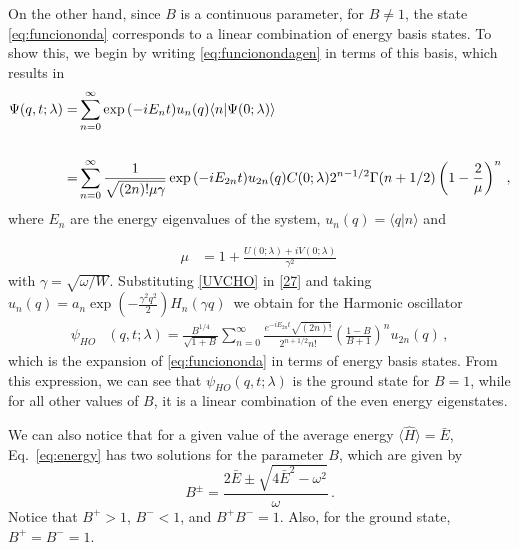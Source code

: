 \documentclass[12pt]{iopart}
\begin{document}
On the other hand, since $B$ is a continuous parameter, for $B\neq 1$, the state \eqref{eq:funciononda} corresponds to a linear combination of energy basis states. To show this, we begin by writing \eqref{eq:funcionondagen} in terms of this basis, which results in 
\begin{align}\label{27}
    \Psi(q,t;\lambda)
    =&\sum_{n=0}^{\infty} \exp{(-iE_nt)}u_n(q) \langle n | \Psi(0;\lambda)  \rangle \nonumber  \\ \vspace*{-2cm} \nonumber \\
    =&\sum_{n=0}^{\infty} \frac{1}{\sqrt{(2n)!\mu\gamma}} \exp{(-iE_{2n}t)}u_{2n}(q)  C(0;\lambda)2^{n-1/2} \Gamma(n+1/2)\left(1- \frac{2}{\mu} \right)^n\,,
\end{align}
where $E_n$ are the energy eigenvalues of the system, $u_n(q)=\langle q|n\rangle $ and

\begin{align}    
\mu&=1+\frac{U(0;\lambda)+iV(0;\lambda)}{\gamma^2}\,\label{un}
\end{align}
with $\gamma=\sqrt{\omega/W}$. Substituting \eqref{UVCHO} in \eqref{27} and taking 
$u_n(q)=a_n\exp{\left(-\frac{\gamma^2 q^2}{2}\right)}H_n\left( \gamma q \right)\,$  we obtain for the Harmonic oscillator 
\begin{align}
\psi_{HO}&(q,t;\lambda) = \frac{B^{1/4}}{\sqrt{1+B}}\sum_{n=0}^{\infty}  \frac{e^{-iE_{2n}t}\sqrt{(2n)!}}{2^{n+1/2}n!}\left(\frac{1-B}{B+1}
     \label{fourierpart} \right)^n u_{2n}(q)  \,, 
\end{align}
which is the expansion of \eqref{eq:funciononda} in terms of energy basis states. From this expression, we can see that $\psi_{HO}(q,t;\lambda)$ is the ground state for $B=1$, while for all other values of $B$, it is a linear combination of the even energy eigenstates. 

We can also notice that for a given value of the average energy $\langle \hat{H} \rangle= \bar E$, Eq.~\eqref{eq:energy} has two solutions for the parameter $B$, which are given by
\begin{equation}\label{bee1}
    B^{\pm} = \frac{2\bar E \pm \sqrt{4 \bar E^2-\omega^2 }}{\omega}\,.
\end{equation}
Notice that $B^{+}>1$, $B^{-}<1$, and $B^+ B^- =1$. Also, for the ground state, $B^{+}=B^{-}=1$.
\end{document}
